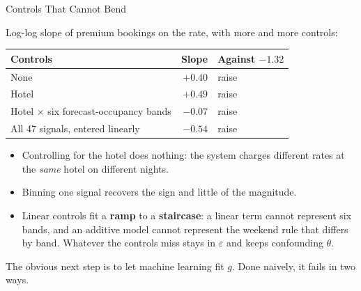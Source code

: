 \documentclass[aspectratio=169, 11pt, handout]{beamer}
\begin{document}
\begin{frame}{Controls That Cannot Bend}

Log-log slope of premium bookings on the rate, with more and more controls:

\begin{center}
\small
\begin{tabular}{lrl}
\toprule
\textbf{Controls} & \textbf{Slope} & \textbf{Against $-1.32$} \\
\midrule
None & \textcolor{warnred}{$+0.40$} & raise \\
Hotel & \textcolor{warnred}{$+0.49$} & raise \\
Hotel $\times$ six forecast-occupancy bands & \textcolor{warnred}{$-0.07$} & raise \\
All 47 signals, entered linearly & \textcolor{warnred}{$-0.54$} & raise \\
\bottomrule
\end{tabular}
\end{center}

\medskip

\begin{itemize}
  \item Controlling for the hotel does nothing: the system charges different rates at the \emph{same} hotel on different nights.
  \item Binning one signal recovers the sign and little of the magnitude.
  \item Linear controls fit a \textbf{ramp} to a \textbf{staircase}: a linear term cannot represent six bands, and an additive model cannot represent the weekend rule that differs by band. Whatever the controls miss stays in $\varepsilon$ and keeps confounding $\theta$.
\end{itemize}

\medskip

The obvious next step is to let machine learning fit $g$. Done naively, it fails in two ways.
\end{frame}
\end{document}
